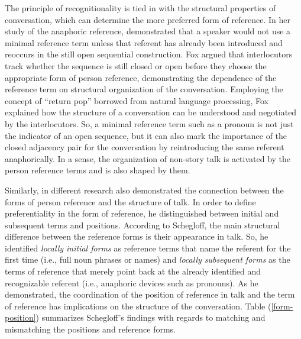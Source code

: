 \documentclass[12pt]{article}
\begin{document}
The principle of recognitionality is tied in with the structural properties of conversation, which can determine the more preferred form of reference. In her study of the anaphoric reference, \textcite{fox1987} demonstrated that a speaker would not use a minimal reference term unless that referent has already been introduced and reoccurs in the still open sequential construction. Fox argued that interlocutors track whether the sequence is still closed or open before they choose the appropriate form of person reference, demonstrating the dependence of the reference term on structural organization of the conversation. Employing the concept of ``return pop'' borrowed from natural language processing, Fox explained how the structure of a conversation can be understood and negotiated by the interlocutors. So, a minimal reference term such as a pronoun is not just the indicator of an open sequence, but it can also mark the importance of the closed adjacency pair for the conversation by reintroducing the same referent anaphorically. In a sense, the organization of non-story talk is activated by the person reference terms and is also shaped by them.   

Similarly, in different research \textcite{schegloff1996b} also demonstrated the connection between the forms of person reference and the structure of talk. In order to define preferentiality in the form of reference, he distinguished between initial and subsequent terms and positions. According to Schegloff, the main structural difference between the reference forms is their appearance in talk. So, he identified \textit{locally initial forms} as reference terms that name the referent for the first time (i.e., full noun phrases or names) and\textit{ locally subsequent forms} as the terms of reference that merely point back at the already identified and recognizable referent (i.e., anaphoric devices such as pronouns). As he demonstrated, the coordination of the position of reference in talk and the term of reference has implications on the structure of the conversation. Table (\ref{form-position}) summarizes Schegloff's findings with regards to matching and mismatching the positions and reference forms.
\end{document}
